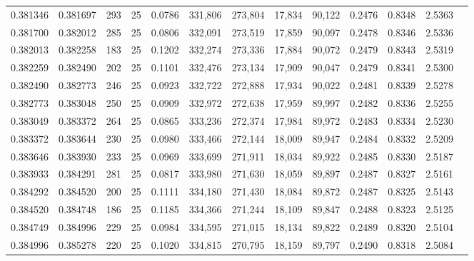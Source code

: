 \begin{tabular}{rrrrrrrrrrrrr}
0.381346 & 0.381697 &   293 &  25 &                                     0.0786 & 331,806 & 273,804 &  17,834 &  90,122 & 0.2476 & 0.8348 & 2.5363 \\
0.381700 & 0.382012 &   285 &  25 &                                     0.0806 & 332,091 & 273,519 &  17,859 &  90,097 & 0.2478 & 0.8346 & 2.5336 \\
0.382013 & 0.382258 &   183 &  25 &                                     0.1202 & 332,274 & 273,336 &  17,884 &  90,072 & 0.2479 & 0.8343 & 2.5319 \\
0.382259 & 0.382490 &   202 &  25 &                                     0.1101 & 332,476 & 273,134 &  17,909 &  90,047 & 0.2479 & 0.8341 & 2.5300 \\
0.382490 & 0.382773 &   246 &  25 &                                     0.0923 & 332,722 & 272,888 &  17,934 &  90,022 & 0.2481 & 0.8339 & 2.5278 \\
0.382773 & 0.383048 &   250 &  25 &                                     0.0909 & 332,972 & 272,638 &  17,959 &  89,997 & 0.2482 & 0.8336 & 2.5255 \\
0.383049 & 0.383372 &   264 &  25 &                                     0.0865 & 333,236 & 272,374 &  17,984 &  89,972 & 0.2483 & 0.8334 & 2.5230 \\
0.383372 & 0.383644 &   230 &  25 &                                     0.0980 & 333,466 & 272,144 &  18,009 &  89,947 & 0.2484 & 0.8332 & 2.5209 \\
0.383646 & 0.383930 &   233 &  25 &                                     0.0969 & 333,699 & 271,911 &  18,034 &  89,922 & 0.2485 & 0.8330 & 2.5187 \\
0.383933 & 0.384291 &   281 &  25 &                                     0.0817 & 333,980 & 271,630 &  18,059 &  89,897 & 0.2487 & 0.8327 & 2.5161 \\
0.384292 & 0.384520 &   200 &  25 &                                     0.1111 & 334,180 & 271,430 &  18,084 &  89,872 & 0.2487 & 0.8325 & 2.5143 \\
0.384520 & 0.384748 &   186 &  25 &                                     0.1185 & 334,366 & 271,244 &  18,109 &  89,847 & 0.2488 & 0.8323 & 2.5125 \\
0.384749 & 0.384996 &   229 &  25 &                                     0.0984 & 334,595 & 271,015 &  18,134 &  89,822 & 0.2489 & 0.8320 & 2.5104 \\
0.384996 & 0.385278 &   220 &  25 &                                     0.1020 & 334,815 & 270,795 &  18,159 &  89,797 & 0.2490 & 0.8318 & 2.5084 \\

\end{tabular}

